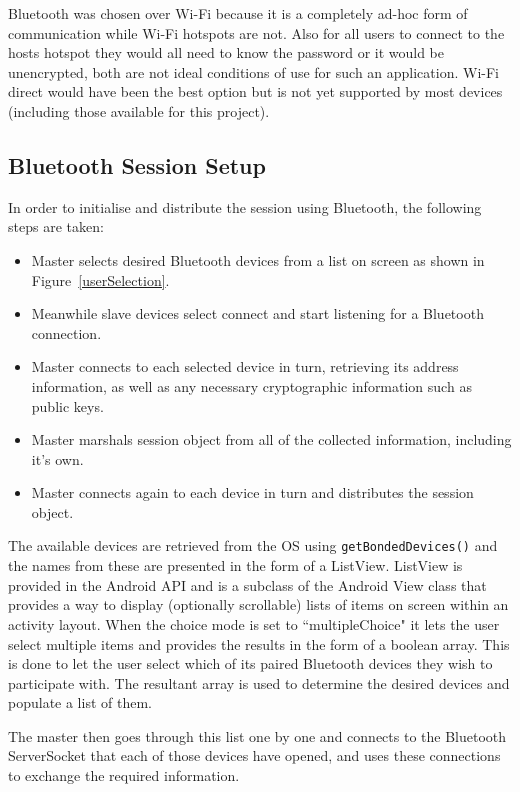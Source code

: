 Bluetooth was chosen over Wi-Fi because it is a completely ad-hoc form of communication while Wi-Fi hotspots are not. Also for all users to connect to the hosts hotspot they would all need to know the password or it would be unencrypted, both are not ideal conditions of use for such an application. Wi-Fi direct would have been the best option but is not yet supported by most devices (including those available for this project).\cite{Wi-FiDirect}

\subsection{Bluetooth Session Setup}
\label{bt setup}
In order to initialise and distribute the session using Bluetooth, the following steps are taken:

\begin{itemize}
\item{Master selects desired Bluetooth devices from a list on screen as shown in Figure~\ref{userSelection}.}
\item{Meanwhile slave devices select connect and start listening for a Bluetooth connection.}
\item{Master connects to each selected device in turn, retrieving its address information, as well as any necessary cryptographic information such as public keys.}
\item{Master marshals session object from all of the collected information, including it's own.}
\item{Master connects again to each device in turn and distributes the session object.}
\end{itemize}

The available devices are retrieved from the OS using {\tt getBondedDevices()} and the names from these are presented in the form of a ListView. ListView is provided in the Android API and is a subclass of the Android View class that provides a way to display (optionally scrollable) lists of items on screen within an activity layout. When the choice mode is set to ``multipleChoice" it lets the user select multiple items and provides the results in the form of a boolean array. This is done to let the user select which of its paired Bluetooth devices they wish to participate with. The resultant array is used to determine the desired devices and populate a list of them.

The master then goes through this list one by one and connects to the Bluetooth ServerSocket that each of those devices have opened, and uses these connections to exchange the required information.

